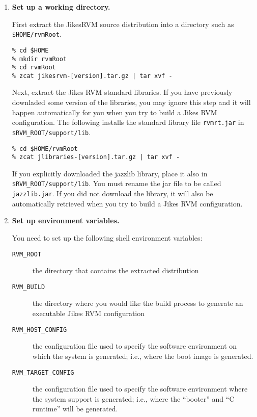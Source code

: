 \begin{enumerate}
\item {\bf Set up a working directory.}

First extract the Jikes\trademark RVM source distribution into a
directory such as  
{\tt \$HOME/rvmRoot}.
\begin{verbatim}
% cd $HOME
% mkdir rvmRoot
% cd rvmRoot
% zcat jikesrvm-[version].tar.gz | tar xvf - 
\end{verbatim}

Next, extract the Jikes RVM standard libraries. If you have previously
downladed some version of the libraries, you may ignore this step and
it will happen automatically for you when you try to build a
Jikes RVM configuration.  The following installs the
standard library file {\tt rvmrt.jar} in {\tt \$RVM\_ROOT/support/lib}.
\begin{verbatim}
% cd $HOME/rvmRoot
% zcat jlibraries-[version].tar.gz | tar xvf - 
\end{verbatim}

If you explicitly downloaded the jazzlib library, place it also in 
{\tt \$RVM\_ROOT/support/lib}.  You must rename the jar file 
to be called {\tt jazzlib.jar}.
If you did not download the library,
it will also be automatically retrieved when you try to build a Jikes RVM
configuration. 

\item {\bf Set up environment variables.}

You need to set up the following shell environment variables:

\begin{description}
\item [{\tt RVM\_ROOT}] the directory that contains the extracted
distribution 
\item [{\tt RVM\_BUILD}] the directory where you would like the build
process to generate an executable Jikes RVM configuration

\item [{\tt RVM\_HOST\_CONFIG}] the configuration file used to specify
the software environment on which the system is generated; i.e., where the
boot image is generated.

\item [{\tt RVM\_TARGET\_CONFIG}] the configuration file used to specify
the software environment where the system support is generated; i.e., where
the ``booter'' and ``C runtime'' will be generated.


\end{description}
\end{enumerate}
